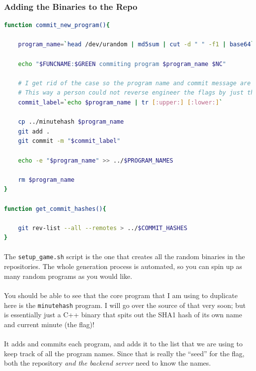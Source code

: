 \documentclass[11pt]{article}
\begin{document}
	\newpage

	\subsubsection{Adding the Binaries to the Repo}

	\begin{lstlisting}[language=bash]
function commit_new_program(){

	program_name=`head /dev/urandom | md5sum | cut -d " " -f1 | base64`

	echo "$FUNCNAME:$GREEN commiting program $program_name $NC"

	# I get rid of the case so the program name and commit message are not equivalent
	# This way a person could not reverse engineer the flags by just the commit message alone
	commit_label=`echo $program_name | tr [:upper:] [:lower:]`

	cp ../minutehash $program_name
	git add . 
	git commit -m "$commit_label"

	echo -e "$program_name" >> ../$PROGRAM_NAMES

	rm $program_name
}

function get_commit_hashes(){

	git rev-list --all --remotes > ../$COMMIT_HASHES
}
	\end{lstlisting}	

	\paragraph{} The \texttt{setup\_game.sh} script is the one that creates all the random binaries in the repositories. The whole generation process is automated, so you can spin up as many random programs as you would like.

	\paragraph{} You should be able to see that the core program that I am using to duplicate here is the \texttt{minutehash} program. I will go over the source of that very soon; but is essentially just a C++ binary that spits out the SHA1 hash of its own name and current minute (the flag)!

	\paragraph{} It adds and commits each program, and adds it to the list that we are using to keep track of all the program names. Since that is really the ``seed'' for the flag, both the repository \textit{and the backend server} need to know the names. 
\end{document}
